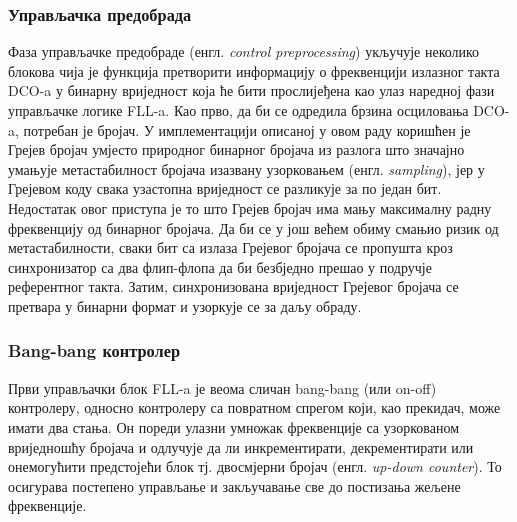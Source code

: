 \documentclass[master]{finthesis}
\def \FLL {FLL} %
\def \DCO {DCO} %
\begin{document}
\subsubsection{Управљачка предобрада}
Фаза управљачке предобраде (енгл. \textit{control preprocessing}) укључује неколико блокова чија је функција претворити информацију о фреквенцији излазног такта \DCO-a у бинарну вриједност која ће бити прослијеђена као улаз наредној фази управљачке логике \FLL-a. Као прво, да би се одредила брзина осциловања \DCO-a, потребан је бројач. У имплементацији описаној у овом раду коришћен је Грејев бројач умјесто природног бинарног бројача из разлога што значајно умањује метастабилност бројача изазвану узорковањем (енгл. \textit{sampling}), јер у Грејевом коду свака узастопна вриједност се разликује за по један бит. Недостатак овог приступа је то што Грејев бројач има мању максималну радну фреквенцију од бинарног бројача. Да би се у још већем обиму смањио ризик од метастабилности, сваки бит са излаза Грејевог бројача се пропушта кроз синхронизатор са два флип-флопа да би безбједно прешао у подручје референтног такта. Затим, синхронизована вриједност Грејевог бројача се претвара у бинарни формат и узоркује се за даљу обраду.

\subsubsection{Bang-bang контролер}
Први управљачки блок \FLL-a је веома сличан bang-bang (или on-off) контролеру, односно контролеру са повратном спрегом који, као прекидач, може имати два стања. Он пореди улазни умножак фреквенције са узоркованом вриједношћу бројача и одлучује да ли инкрементирати, декрементирати или онемогућити предстојећи блок тј. двосмјерни бројач (енгл. \textit{up-down counter}). То осигурава постепено управљање и закључавање све до постизања жељене фреквенције.

\end{document}
